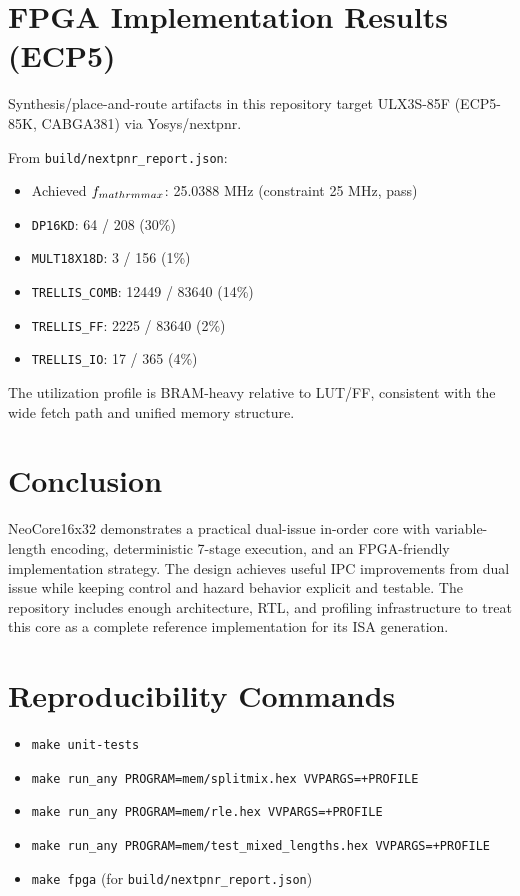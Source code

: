 \documentclass[11pt]{article}
\begin{document}
\section{FPGA Implementation Results (ECP5)}
Synthesis/place-and-route artifacts in this repository target ULX3S-85F (ECP5-85K, CABGA381) via Yosys/nextpnr.

From \texttt{build/nextpnr\_report.json}:
\begin{itemize}[leftmargin=*]
  \item Achieved $f_{\\mathrm{max}}$: 25.0388 MHz (constraint 25 MHz, pass)
  \item \texttt{DP16KD}: 64 / 208 (30\%)
  \item \texttt{MULT18X18D}: 3 / 156 (1\%)
  \item \texttt{TRELLIS\_COMB}: 12449 / 83640 (14\%)
  \item \texttt{TRELLIS\_FF}: 2225 / 83640 (2\%)
  \item \texttt{TRELLIS\_IO}: 17 / 365 (4\%)
\end{itemize}

The utilization profile is BRAM-heavy relative to LUT/FF, consistent with the wide fetch path and unified memory structure.

\section{Conclusion}
NeoCore16x32 demonstrates a practical dual-issue in-order core with variable-length encoding, deterministic 7-stage execution, and an FPGA-friendly implementation strategy. The design achieves useful IPC improvements from dual issue while keeping control and hazard behavior explicit and testable. The repository includes enough architecture, RTL, and profiling infrastructure to treat this core as a complete reference implementation for its ISA generation.

\section*{Reproducibility Commands}
\begin{itemize}[leftmargin=*]
  \item \texttt{make unit-tests}
  \item \texttt{make run\_any PROGRAM=mem/splitmix.hex VVPARGS=+PROFILE}
  \item \texttt{make run\_any PROGRAM=mem/rle.hex VVPARGS=+PROFILE}
  \item \texttt{make run\_any PROGRAM=mem/test\_mixed\_lengths.hex VVPARGS=+PROFILE}
  \item \texttt{make fpga} (for \texttt{build/nextpnr\_report.json})
\end{itemize}
\end{document}
